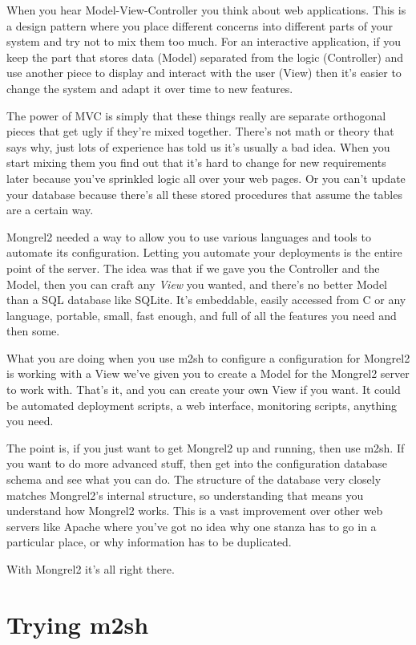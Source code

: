 When you hear Model-View-Controller you think about web applications.  This is a design pattern
where you place different concerns into different parts of your system and try not to mix them
too much.  For an interactive application, if you keep the part that stores data (Model) separated
from the logic (Controller) and use another piece to display and interact with the user (View) then
it's easier to change the system and adapt it over time to new features.

The power of MVC is simply that these things really are separate orthogonal pieces that get
ugly if they're mixed together.  There's not math or theory that says why, just lots of 
experience has told us it's usually a bad idea.  When you start mixing them you find out that
it's hard to change for new requirements later because you've sprinkled logic all over your
web pages.  Or you can't update your database because there's all these stored procedures that
assume the tables are a certain way.

Mongrel2 needed a way to allow you to use various languages and tools to automate its configuration.
Letting you automate your deployments is the entire point of the server.  The idea was that if we
gave you the Controller and the Model, then you can craft any \emph{View} you wanted, and there's
no better Model than a SQL database like SQLite.  It's embeddable, easily accessed from C or any
language, portable, small, fast enough, and full of all the features you need and then some.

What you are doing when you use m2sh to configure a configuration for Mongrel2 is working with
a View we've given you to create a Model for the Mongrel2 server to work with.  That's it, and
you can create your own View if you want.  It could be automated deployment scripts, a web
interface, monitoring scripts, anything you need.

The point is, if you just want to get Mongrel2 up and running, then use m2sh.  If you want to
do more advanced stuff, then get into the configuration database schema and see what you can
do.  The structure of the database very closely matches Mongrel2's internal structure, so 
understanding that means you understand how Mongrel2 works.  This is a vast improvement over
other web servers like Apache where you've got no idea why one stanza has to go in a particular
place, or why information has to be duplicated.

With Mongrel2 it's all right there.


\section{Trying m2sh}

